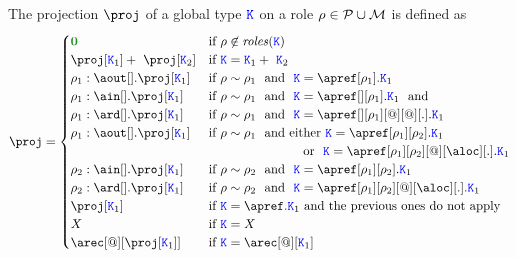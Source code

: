 The projection $\proj$ of a global type $\texttt{\textcolor{blue}K}$ on a role $\rho \in \mathcal{P} \cup \mathcal{M}$ is
defined as
\[
  \proj =
  \begin{cases}
    \nil   
    & \text{if } 
        \arole \not \in \roles \aK  
    \\
    \proj[\aK_1] +\ \proj[\aK_2]   
    & \text{if } 
        \aK = \aK_1 +\  \aK_2  
    \\
    \arole_1 : \aout[].\proj[\aK_1]   
    & \text{if } 
        \arole \eqR \arole_1\  \text{ and }\ \aK = \apref[\arole_1].\aK_1  
    \\
    \arole_1 : \ain[].\proj[\aK_1]
    & \text{if } 
      	\arole \eqR \arole_1\  \text{ and }\ \aK = \apref[{}][\arole_1].\aK_1  \ \text{ and }
    \\
    \arole_1 : \ard[].\proj[\aK_1]
    & \text{if } 
    	\arole \eqR \arole_1\  \text{ and }\ \aK = \apref[{}][\arole_1][@][@][.].\aK_1
    \\
    \arole_1 : \aout[].\proj[\aK_1]   
    & \text{if } 
    \arole \eqR \arole_1\  \text{ and either}\  
    \aK = \apref[\arole_1][\arole_2].\aK_1 
    \\ & \hspace{2.5cm}\text{ or }\ \aK = \apref[\arole_1][\arole_2][@][\aloc][.].\aK_1
     \\
    \arole_2 : \ain[].\proj[\aK_1]   
    & \text{if } 
    \arole \eqR \arole_2\  \text{ and }\  
    \aK = \apref[\arole_1][\arole_2].\aK_1
    \\
    \arole_2 : \ard[].\proj[\aK_1]   
    & \text{if } 
    \arole \eqR \arole_2\  \text{ and }\  
    \aK = \apref[\arole_1][\arole_2][@][\aloc][.].\aK_1
    \\
    \proj[\aK_1]   
    & \text{if } \aK = \apref.\aK_1
    \text{ and the previous ones do not apply}
   \\
    X & \text{if } \aK = X \\
    \arec[@][{\proj[\aK_1]}] & \text{if } \aK = \arec[@][\aK_1]
  \end{cases}
\]





